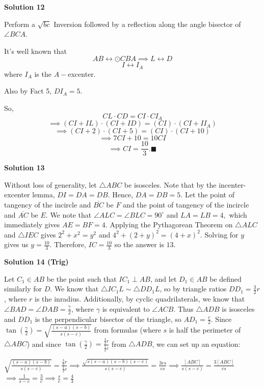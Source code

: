 \begin{enumerate}
 



\textbf{Solution 12}

Perform a $\sqrt{bc}$ Inversion followed by a reflection along the angle bisector of $\angle BCA$.

 It's well known that
 \[AB \leftrightarrow \odot CBA \implies L \leftrightarrow D\]
 \[I \leftrightarrow I_A\]where $I_A$ is the $A-$excenter.

 Also by Fact 5, $DI_A = 5$.

 So,
 \[CL \cdot CD = CI \cdot CI_A\]
 \[\implies (CI + IL) \cdot (CI + ID) = (CI) \cdot (CI + II_A)\]
 \[\implies (CI + 2) \cdot (CI + 5) = (CI) \cdot (CI + 10)\]
 \[\implies 7CI +10= 10CI\]
 \[\implies CI = \boxed{\dfrac{10}{3}}.\blacksquare\]




\textbf{Solution 13}

Without loss of generality, let $\triangle ABC$ be isosceles. Note that by the incenter-excenter lemma, $DI = DA = DB.$ Hence, $DA=DB=5.$ Let the point of tangency of the incircle and $\overline{BC}$ be $F$ and the point of tangency of the incircle and $\overline{AC}$ be $E.$ We note that $\angle ALC = \angle BLC = 90^\circ$ and $LA=LB=4,$ which immediately gives $AE=BF=4.$ Applying the Pythagorean Theorem on $\triangle ALC$ and $\triangle IEC$ gives $2^2+x^2=y^2$ and $4^2+(2+y)^2 = (4+x)^2.$ Solving for $y$ gives us $y=\frac{10}{3}.$ Therefore, $IC = \frac{10}{3}$ so the answer is $\boxed{13}.$




\textbf{Solution 14 (Trig)}

Let $C_1\in AB$ be the point such that $IC_1\perp AB$, and let $D_1\in AB$ be defined similarly for $D$. We know that $\triangle IC_1L\sim\triangle DD_1L$, so by triangle ratios $DD_1=\frac{3}{2}r$, where $r$ is the inradius. Additionally, by cyclic quadrilaterals, we know that $\angle BAD=\angle DAB=\frac{\gamma}{2}$, where $\gamma$ is equivalent to $\angle ACB$. Thus $\triangle ADB$ is isosceles and $DD_1$ is the perpendicular bisector of the triangle, so $AD_1=\frac{c}{2}$. Since $\tan\left(\frac{\gamma}{2}\right)=\sqrt{\frac{(s-a)(s-b)}{s(s-c)}}$ from formulas (where $s$ is half the perimeter of $\triangle ABC$) and since $\tan\left(\frac{\gamma}{2}\right)=\frac{\frac{3}{2}r}{\frac{1}{2}c}$ from $\triangle ADB$, we can set up an equation:

 $\sqrt{\frac{(s-a)(s-b)}{s(s-c)}}=\frac{\frac{3}{2}r}{\frac{1}{2}c}\implies\frac{\sqrt{s(s-a)(s-b)(s-c)}}{s(s-c)}=\frac{3rs}{cs}\implies\frac{[ABC]}{s(s-c)}=\frac{3[ABC]}{cs}$
$\implies\frac{1}{s-c}=\frac{3}{c}\implies \frac{s}{c}=\frac{4}{3}$


\end{enumerate}
